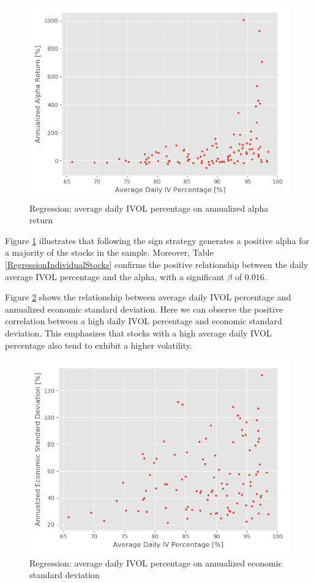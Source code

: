 \begin{figure}[h]
    \centering
    \includegraphics[scale = 0.5]{Plot/IndividualStockRegression2.png}
    \caption{Regression: average daily IVOL percentage on annualized alpha return}
    \label{IVAlphaRegression}
\end{figure}

Figure \ref{IVAlphaRegression} illustrates that following the sign strategy generates a positive alpha for a majority of the stocks in the sample. Moreover, Table \ref{RegressionIndividualStocks} confirms the positive relationship between the daily average IVOL percentage and the alpha, with a significant $\beta$ of $0.016$. 

Figure \ref{IVtoVol} shows the relationship between average daily IVOL percentage and annualized economic standard deviation. Here we can observe the positive correlation between a high daily IVOL percentage and economic standard deviation. This emphasizes that stocks with a high average daily IVOL percentage also tend to exhibit a higher volatility.  

\begin{figure}[h]
    \centering
    \includegraphics[scale = 0.5]{Plot/IVvsEconomicVolatilityRegression.png}
    \caption{Regression: average daily IVOL percentage on annualized economic standard deviation}
    \label{IVtoVol}
\end{figure}

